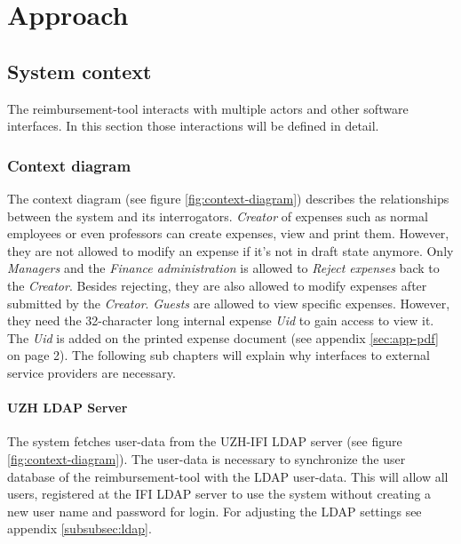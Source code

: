 \chapter{Approach}

\section{System context}

The reimbursement-tool interacts with multiple actors and other software interfaces. In this section those interactions will be defined in detail.

\subsection{Context diagram}

The context diagram (see figure \ref{fig:context-diagram}) describes the relationships between the system and its interrogators. \textit{Creator} of expenses such as normal employees or even professors can create expenses, view and print them. However, they are not allowed to modify an expense if it's not in draft state anymore. Only \textit{Managers} and the \textit{Finance administration} is allowed to \textit{Reject expenses} back to the \textit{Creator}. Besides rejecting, they are also allowed to modify expenses after submitted by the \textit{Creator}.\newline
\textit{Guests} are allowed to view specific expenses. However, they need the 32-character long internal expense \textit{Uid} to gain access to view it. The \textit{Uid} is added on the printed expense document (see appendix \ref{sec:app-pdf} on page 2).\newline
The following sub chapters will explain why interfaces to external service providers are necessary.

\subsubsection{UZH LDAP Server}

The system fetches user-data from the UZH-IFI LDAP server (see figure \ref{fig:context-diagram}). The user-data is necessary to synchronize the user database of the reimbursement-tool with the LDAP user-data. This will allow all users, registered at the IFI LDAP server to use the system without creating a new user name and password for login. For adjusting the LDAP settings see appendix \ref{subsubsec:ldap}.



